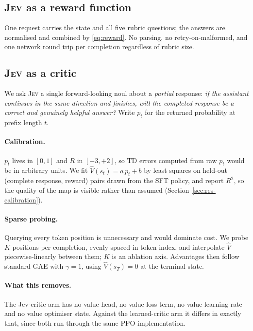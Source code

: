 \documentclass[11pt]{article}
\newcommand{\jev}{\textsc{Jev}}
\begin{document}
\subsection{\jev{} as a reward function}
One request carries the state and all five rubric questions; the answers are
normalised and combined by \eqref{eq:reward}. No parsing, no retry-on-malformed,
and one network round trip per completion regardless of rubric size.

\subsection{\jev{} as a critic}
\label{sec:critic}
We ask \jev{} a single forward-looking noul about a \emph{partial} response:
\emph{if the assistant continues in the same direction and finishes, will the
completed response be a correct and genuinely helpful answer?} Write $p_t$ for
the returned probability at prefix length $t$.

\paragraph{Calibration.} $p_t$ lives in $[0,1]$ and $R$ in $[-3,+2]$, so TD
errors computed from raw $p_t$ would be in arbitrary units. We fit
$\hat{V}(s_t) = a\,p_t + b$ by least squares on held-out
(complete response, reward) pairs drawn from the SFT policy, and report $R^2$,
so the quality of the map is visible rather than assumed
(Section~\ref{sec:res-calibration}).

\paragraph{Sparse probing.} Querying every token position is unnecessary and
would dominate cost. We probe $K$ positions per completion, evenly spaced in
token index, and interpolate $\hat{V}$ piecewise-linearly between them; $K$ is an
ablation axis. Advantages then follow standard GAE with $\gamma = 1$, using
$\hat{V}(s_{T}) = 0$ at the terminal state.

\paragraph{What this removes.} The Jev-critic arm has no value head, no value
loss term, no value learning rate and no value optimiser state. Against the
learned-critic arm it differs in exactly that, since both run through the same
PPO implementation.
\end{document}
